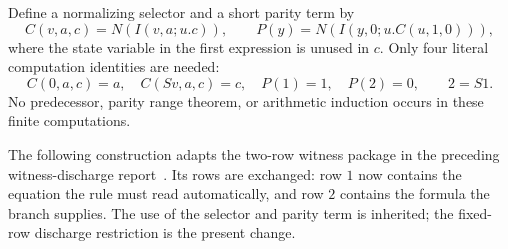 \documentclass[11pt,letterpaper]{article}
\theoremstyle{definition}\newtheorem{definition}[theorem]{Definition}
\theoremstyle{remark}\newtheorem{remark}[theorem]{Remark}
\begin{document}
Define a normalizing selector and a short parity term by
\[
 C(v,a,c)=N(I(v,a;u.c)),\qquad
 P(y)=N(I(y,0;u.C(u,1,0))),
\]
where the state variable in the first expression is unused in $c$.
Only four literal computation identities are needed:
\begin{equation}
 C(0,a,c)=a,\quad C(Sv,a,c)=c,\quad
 P(1)=1,\quad P(2)=0,\qquad 2=S1.
 \label{eq:row-endpoints}
\end{equation}
No predecessor, parity range theorem, or arithmetic induction occurs in
these finite computations.

The following construction adapts the two-row witness package in the
preceding witness-discharge report~\cite{prior}.  Its rows are
exchanged: row $1$ now contains the equation the rule must read
automatically, and row $2$ contains the formula the branch supplies.
The use of the selector and parity term is inherited; the fixed-row
discharge restriction is the present change.
\end{document}
